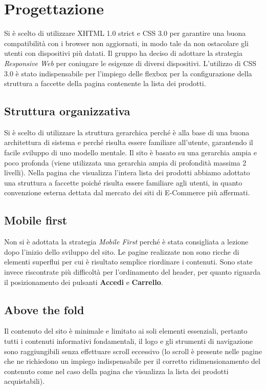 \section{Progettazione}
Si è scelto di utilizzare XHTML 1.0 strict e CSS 3.0 per garantire una buona compatibilità con i browser non aggiornati, in modo tale da non ostacolare gli utenti con dispositivi più datati.
Il gruppo ha deciso di adottare la strategia \textit{Responsive Web} per coniugare le esigenze di diversi dispositivi. L'utilizzo di CSS 3.0 è stato indispensabile per l'impiego delle flexbox per la configurazione della struttura a faccette della pagina contenente la lista dei prodotti.
\subsection{Struttura organizzativa} 
Si è scelto di utilizzare la struttura gerarchica perché è alla base di una buona architettura di sistema e perché risulta essere familiare all'utente, garantendo il facile sviluppo di uno modello mentale. Il sito è basato su una gerarchia ampia e poco profonda (viene utilizzata una gerarchia ampia di profondità massima 2 livelli).
Nella pagina che visualizza l'intera lista dei prodotti abbiamo adottato una struttura a faccette poiché risulta essere familiare agli utenti, in quanto convenzione esterna dettata dal mercato dei siti di E-Commerce più affermati.
\subsection{Mobile first}
Non si è adottata la strategia \textit{Mobile First} perché è stata consigliata a lezione dopo l'inizio dello sviluppo del sito. Le pagine realizzate non sono ricche di elementi superflui per cui è risultato semplice riordinare i contenuti. Sono state invece riscontrate più difficoltà per l'ordinamento del header, per quanto riguarda il posizionamento dei pulsanti \textbf{Accedi} e \textbf{Carrello}.
\subsection{Above the fold}
Il contenuto del sito è minimale e limitato ai soli elementi essenziali, pertanto tutti i contenuti informativi fondamentali, il logo e gli strumenti di navigazione sono raggiungibili senza effettuare scroll eccessivo (lo scroll è presente nelle pagine che ne richiedono un impiego indispensabile per il corretto ridimensionamento del contenuto come nel caso della pagina che visualizza la lista dei prodotti acquistabili).
